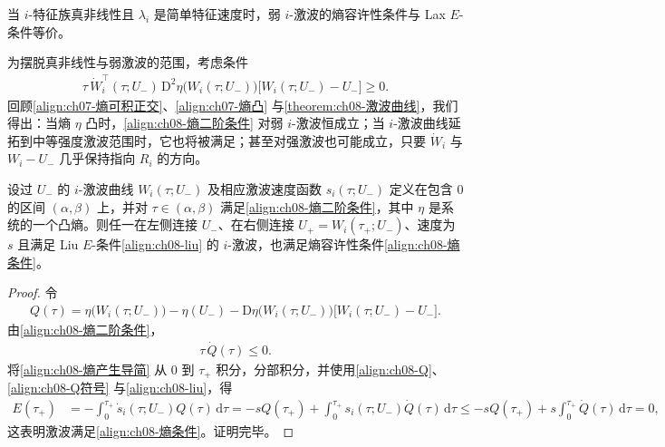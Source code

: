 \documentclass[../../main.tex]{subfiles}
\begin{document}
\begin{theorem}\label{theorem:ch08-熵lax等价}
当 $i$-特征族真非线性且 $\lambda_i$ 是简单特征速度时，弱 $i$-激波的熵容许性条件与 Lax $E$-条件等价。
\end{theorem}

为摆脱真非线性与弱激波的范围，考虑条件
\begin{align}
\tau\,\dot W_i^{\top}(\tau;U_-)\,\mathrm{D}^2\eta\big(W_i(\tau;U_-)\big)\big[W_i(\tau;U_-)-U_-\big]\geqslant0.
\label{align:ch08-熵二阶条件}
\end{align}
回顾\eqref{align:ch07-熵可积正交}、\eqref{align:ch07-熵凸} 与\cref{theorem:ch08-激波曲线}，我们得出：当熵 $\eta$ 凸时，\eqref{align:ch08-熵二阶条件} 对弱 $i$-激波恒成立；当 $i$-激波曲线延拓到中等强度激波范围时，它也将被满足；甚至对强激波也可能成立，只要 $\dot W_i$ 与 $W_i-U_-$ 几乎保持指向 $R_i$ 的方向。

\begin{theorem}\label{theorem:ch08-liu蕴涵熵}
设过 $U_-$ 的 $i$-激波曲线 $W_i(\tau;U_-)$ 及相应激波速度函数 $s_i(\tau;U_-)$ 定义在包含 $0$ 的区间 $(\alpha,\beta)$ 上，并对 $\tau\in(\alpha,\beta)$ 满足\eqref{align:ch08-熵二阶条件}，其中 $\eta$ 是系统的一个凸熵。则任一在左侧连接 $U_-$、在右侧连接 $U_+=W_i(\tau_+;U_-)$、速度为 $s$ 且满足 Liu $E$-条件\eqref{align:ch08-liu} 的 $i$-激波，也满足熵容许性条件\eqref{align:ch08-熵条件}。
\end{theorem}

\begin{proof}
令
\begin{align}
Q(\tau)=\eta\big(W_i(\tau;U_-)\big)-\eta(U_-)-\mathrm{D}\eta\big(W_i(\tau;U_-)\big)\big[W_i(\tau;U_-)-U_-\big].
\label{align:ch08-Q}
\end{align}
由\eqref{align:ch08-熵二阶条件}，
\begin{align}
\tau\,\dot Q(\tau)\leqslant0.
\label{align:ch08-Q符号}
\end{align}
将\eqref{align:ch08-熵产生导简} 从 $0$ 到 $\tau_+$ 积分，分部积分，并使用\eqref{align:ch08-Q}、\eqref{align:ch08-Q符号} 与\eqref{align:ch08-liu}，得
\begin{align}
E(\tau_+)
&=-\int_0^{\tau_+}\dot s_i(\tau;U_-)Q(\tau)\,\mathrm{d}\tau
=-sQ(\tau_+)+\int_0^{\tau_+}s_i(\tau;U_-)\dot Q(\tau)\,\mathrm{d}\tau
\leqslant -sQ(\tau_+)+s\int_0^{\tau_+}\dot Q(\tau)\,\mathrm{d}\tau=0,
\label{align:ch08-熵产生积分}
\end{align}
这表明激波满足\eqref{align:ch08-熵条件}。证明完毕。
\end{proof}
\end{document}

